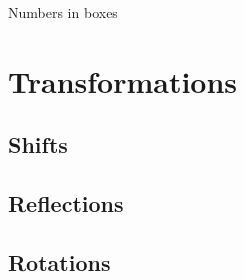 

Numbers in boxes
\newpage
\chapterminitoc

\newpage
\section{Transformations}
\noindent{}
\subsection{Shifts}
\subsection{Reflections}
\subsection{Rotations}
